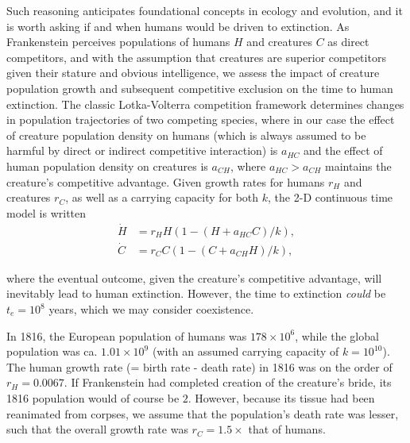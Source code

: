 \documentclass{article}[10pt]
\begin{document}
Such reasoning anticipates foundational concepts in ecology and evolution, and it is worth asking if and when humans would be driven to extinction.
As Frankenstein perceives populations of humans $H$ and creatures $C$ as direct competitors, and with the assumption that creatures are superior competitors given their stature and obvious intelligence, we assess the impact of creature population growth and subsequent competitive exclusion on the time to human extinction.
The classic Lotka-Volterra competition framework determines changes in population trajectories of two competing species, where in our case the effect of creature population density on humans (which is always assumed to be harmful by direct or indirect competitive interaction) is $a_{HC}$ and the effect of human population density on creatures is $a_{CH}$, where $a_{HC} > a_{CH}$ maintains the creature's competitive advantage.
Given growth rates for humans $r_H$ and creatures $r_C$, as well as a carrying capacity for both $k$, the 2-D continuous time model is written
\vspace{-1mm}
\begin{align}
\dot{H}&=r_H H\left(1 - (H + a_{HC} C)/k\right), \\ \nonumber	
\dot{C}&=r_C C\left(1 - (C + a_{CH} H)/k\right),
\end{align}

\noindent where the eventual outcome, given the creature's competitive advantage, will inevitably lead to human extinction.
However, the time to extinction \emph{could} be $t_e=10^8$ years, which we may consider coexistence.

In 1816, the European population of humans was $178\times 10^6$, while the global population was ca. $1.01\times 10^9$ (with an assumed carrying capacity of $k=10^{10}$).
The human growth rate (= birth rate - death rate) in 1816 was on the order of $r_H=0.0067$.
If Frankenstein had completed creation of the creature's bride, its 1816 population would of course be $2$.
However, because its tissue had been reanimated from corpses, we assume that the population's death rate was lesser, such that the overall growth rate was $r_C=1.5\times$ that of humans.
\end{document}
